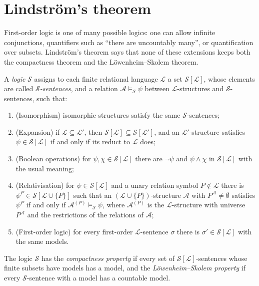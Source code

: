 \section{Lindstr\"om's theorem}\label{model-theory:section-lindstrom}

First-order logic is one of many possible logics: one can allow infinite conjunctions, quantifiers such as ``there are uncountably many'', or quantification
over subsets. Lindstr\"om's theorem says that none of these extensions keeps both the compactness theorem and the L\"owenheim--Skolem theorem.

\begin{definition}\label{model-theory:definition-abstract-logic}
A \emph{logic} $\mathcal{S}$ assigns to each finite relational language $\mathcal{L}$ a set $\mathcal{S}[\mathcal{L}]$, whose elements are called
\emph{$\mathcal{S}$-sentences}, and a relation $\mathcal{A} \models_{\mathcal{S}} \psi$ between $\mathcal{L}$-structures and $\mathcal{S}$-sentences, such that:
\begin{enumerate}
\item (Isomorphism) isomorphic structures satisfy the same $\mathcal{S}$-sentences;
\item (Expansion) if $\mathcal{L} \subseteq \mathcal{L}'$, then $\mathcal{S}[\mathcal{L}] \subseteq \mathcal{S}[\mathcal{L}']$, and an $\mathcal{L}'$-structure
satisfies $\psi \in \mathcal{S}[\mathcal{L}]$ if and only if its reduct to $\mathcal{L}$ does;
\item (Boolean operations) for $\psi, \chi \in \mathcal{S}[\mathcal{L}]$ there are $\neg\psi$ and $\psi \wedge \chi$ in $\mathcal{S}[\mathcal{L}]$ with the usual
meaning;
\item (Relativisation) for $\psi \in \mathcal{S}[\mathcal{L}]$ and a unary relation symbol $P \notin \mathcal{L}$ there is $\psi^P \in \mathcal{S}[\mathcal{L} \cup \{P\}]$
such that an $(\mathcal{L} \cup \{P\})$-structure $\mathcal{A}$ with $P^{\mathcal{A}} \neq \emptyset$ satisfies $\psi^P$ if and only if
$\mathcal{A}^{(P)} \models_{\mathcal{S}} \psi$, where $\mathcal{A}^{(P)}$ is the $\mathcal{L}$-structure with universe $P^{\mathcal{A}}$ and the restrictions of the
relations of $\mathcal{A}$;
\item (First-order logic) for every first-order $\mathcal{L}$-sentence $\sigma$ there is $\sigma' \in \mathcal{S}[\mathcal{L}]$ with the same models.
\end{enumerate}
The logic $\mathcal{S}$ has the \emph{compactness property} if every set of $\mathcal{S}[\mathcal{L}]$-sentences whose finite subsets have models has a model,
and the \emph{L\"owenheim--Skolem property} if every $\mathcal{S}$-sentence with a model has a countable model.
\end{definition}

